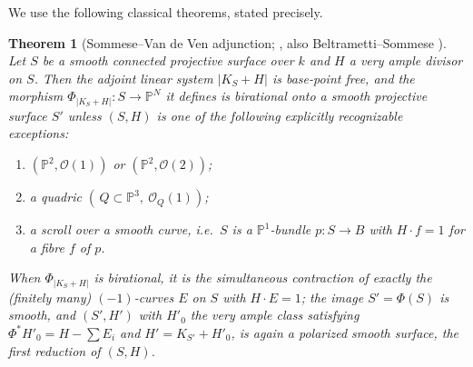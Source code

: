 \documentclass{amsart}
\theoremstyle{plain}
\newtheorem{theorem}{Theorem}
\theoremstyle{definition}
\newcommand{\PP}{\mathbb{P}}
\newcommand{\cO}{\mathcal{O}}
\begin{document}
We use the following classical theorems, stated precisely.

\begin{theorem}[Sommese--Van de Ven adjunction; {\cite[Thm.~I]{SVdV}},
also Beltrametti--Sommese {\cite[Ch.~1, Ch.~7]{BS}}]\label{thm:svdv}
Let $S$ be a smooth connected projective surface over $k$ and $H$ a very ample
divisor on $S$.  Then the adjoint linear system $|K_S+H|$ is base-point free, and
the morphism $\Phi_{|K_S+H|}\colon S\to\PP^{N}$ it defines is birational onto a
smooth projective surface $S'$ \emph{unless} $(S,H)$ is one of the following
explicitly recognizable exceptions:
\begin{enumerate}
\item[(i)] $(\PP^2,\cO(1))$ or $(\PP^2,\cO(2))$;
\item[(ii)] a quadric $(\,Q\subset\PP^3,\ \cO_Q(1))$;
\item[(iii)] a scroll over a smooth curve, i.e.\ $S$ is a $\PP^1$-bundle
$p\colon S\to B$ with $H\cdot f=1$ for a fibre $f$ of $p$.
\end{enumerate}
When $\Phi_{|K_S+H|}$ is birational, it is the simultaneous contraction of
exactly the (finitely many) $(-1)$-curves $E$ on $S$ with $H\cdot E=1$; the image
$S'=\Phi(S)$ is smooth, and $(S',H')$ with $H'_0$ the very ample class satisfying
$\Phi^*H'_0=H-\sum E_i$ and $H'=K_{S'}+H'_0$, is again a polarized smooth
surface, the \emph{first reduction} of $(S,H)$.
\end{theorem}
\end{document}

